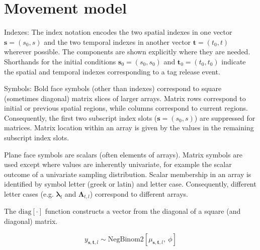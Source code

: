 \documentclass{article}
\begin{document}
\newpage

\section{Movement model}

\noindent Indexes: The index notation encodes the two spatial indexes in one vector $\boldsymbol{s} = \left( s_0,s \right)$ and the two temporal indexes in another vector $\boldsymbol{t} = \left( t_0, t \right)$ wherever possible. The components are shown explicitly where they are needed. Shorthands for the initial conditions $\boldsymbol{s}_0 = (s_0,s_0)$ and $\boldsymbol{t}_0 = (t_0,t_0)$ indicate the spatial and temporal indexes corresponding to a tag release event.
\newline

\noindent Symbols: Bold face symbols (other than indexes) correspond to square (sometimes diagonal) matrix slices of larger arrays. Matrix rows correspond to initial or previous spatial regions, while columns correspond to current regions. Consequently, the first two subscript index slots ($\boldsymbol{s} = (s_0, s)$) are suppressed for matrices. Matrix location within an array is given by the values in the remaining subscript index slots. 

Plane face symbols are scalars (often elements of arrays). Matrix symbols are used except where values are inherently univariate, for example the scalar outcome of a univariate sampling distribution. Scalar membership in an array is identified by symbol letter (greek or latin) and letter case. Consequently, different letter cases (e.g. $\boldsymbol{\lambda}_{l}$ and $\boldsymbol{\Lambda}_{t,l}$) correspond to different arrays.

The $\mathrm{diag} \! \left[ \cdot \right]$ function constructs a vector from the diagonal of a square (and diagonal) matrix.


\begin{equation}
  \label{eq:model-sampling}
  y_{\boldsymbol{s}, \boldsymbol{t},l} \sim \mathrm{NegBinom2} \!
    \left[\mu_{\boldsymbol{s}, \boldsymbol{t},l} \mathrm{,} \: \phi \right]
\end{equation}

\end{document}
